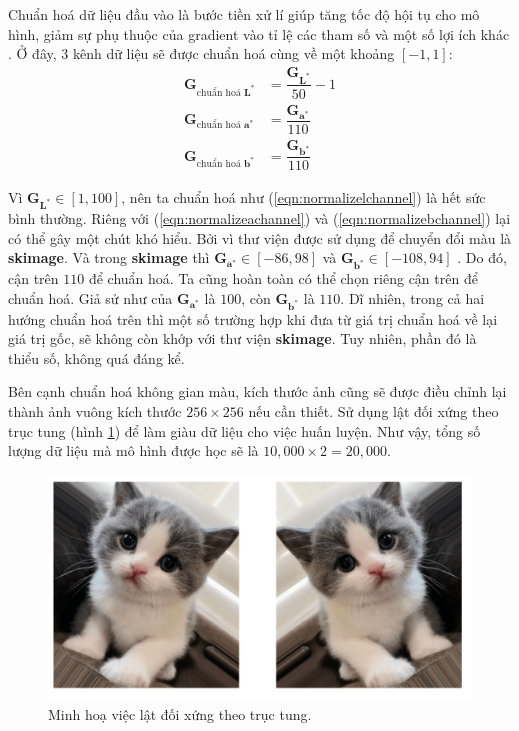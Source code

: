 \documentclass[a4paper, 12pt]{report}
\begin{document}
Chuẩn hoá dữ liệu đầu vào là bước tiền xử lí giúp tăng tốc độ hội tụ cho mô hình, giảm sự phụ thuộc của gradient vào tỉ lệ các tham số và một số lợi ích khác \cite{jasonscaledata2019, benscaledata2012}.
Ở đây, 3 kênh dữ liệu sẽ được chuẩn hoá cùng về một khoảng $[-1, 1]$:
\begin{align}
    \bm{G}_{\text{chuẩn hoá } \mathbf{L}^*} &= \dfrac{\bm{G}_{\mathbf{L}^*}}{50} - 1 \label{eqn:normalizelchannel}\\
    \bm{G}_{\text{chuẩn hoá } \mathbf{a}^*} &= \dfrac{\bm{G}_{\mathbf{a}^*}}{110} \label{eqn:normalizeachannel}\\
    \bm{G}_{\text{chuẩn hoá } \mathbf{b}^*} &= \dfrac{\bm{G}_{\mathbf{b}^*}}{110} \label{eqn:normalizebchannel}
\end{align}

Vì $\bm{G}_{\mathbf{L}^*} \in [1, 100]$, nên ta chuẩn hoá như (\ref{eqn:normalizelchannel}) là hết sức bình thường.
Riêng với (\ref{eqn:normalizeachannel}) và (\ref{eqn:normalizebchannel}) lại có thể gây một chút khó hiểu.
Bởi vì thư viện được sử dụng để chuyển đổi màu là \textbf{skimage}.
Và trong \textbf{skimage} thì $\bm{G}_{\mathbf{a}^*} \in [-86, 98]$ và  $\bm{G}_{\mathbf{b}^*} \in [-108, 94]$ \cite{replyrangelabinskimage2020}.
Do đó, cận trên $110$ để chuẩn hoá.
Ta cũng hoàn toàn có thể chọn riêng cận trên để chuẩn hoá.
Giả sử như của $\bm{G}_{\mathbf{a}^*}$ là $100$, còn $\bm{G}_{\mathbf{b}^*}$ là $110$.
Dĩ nhiên, trong cả hai hướng chuẩn hoá trên thì một số trường hợp khi đưa từ giá trị chuẩn hoá về lại giá trị gốc, sẽ không còn khớp với thư viện \textbf{skimage}.
Tuy nhiên, phần đó là thiểu số, không quá đáng kể.\vspace{5pt}

Bên cạnh chuẩn hoá không gian màu, kích thước ảnh cũng sẽ được điều chỉnh lại thành ảnh vuông kích thước $256\times 256$ nếu cần thiết.
Sử dụng lật đối xứng theo trục tung (hình \ref{fig:horizontalflip}) để làm giàu dữ liệu cho việc huấn luyện.
Như vậy, tổng số lượng dữ liệu mà mô hình được học sẽ là $10,000 \times 2 = 20,000$.

\begin{figure}[!h]
\captionsetup{width=0.8\textwidth}
\centering
\includegraphics[width=15cm]{images/horizontalflip.png}
\caption{Minh hoạ việc lật đối xứng theo trục tung.}
\label{fig:horizontalflip}
\end{figure}
\end{document}
